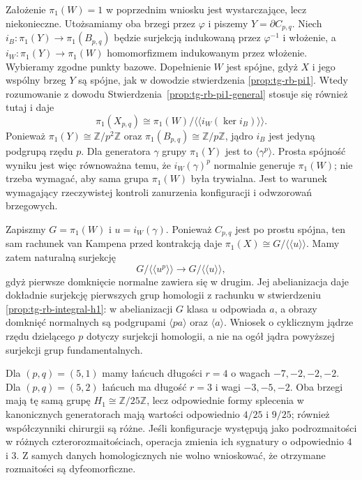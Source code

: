 \begin{uwaga}
\label{rem:tg-general-pi1-normal-closure}
Założenie $\pi_1(W)=1$ w poprzednim wniosku
jest wystarczające, lecz niekonieczne.
Utożsamiamy oba brzegi przez $\varphi$ i piszemy
$Y=\partial C_{p,q}$. Niech
$i_B\colon\pi_1(Y)\to\pi_1(B_{p,q})$
będzie surjekcją indukowaną przez
$\varphi^{-1}$ i włożenie, a
$i_W\colon\pi_1(Y)\to\pi_1(W)$
homomorfizmem indukowanym przez włożenie.
Wybieramy zgodne punkty bazowe. Dopełnienie
$W$ jest spójne, gdyż $X$ i jego wspólny
brzeg $Y$ są spójne, jak w dowodzie
stwierdzenia \ref{prop:tg-rb-pi1}.
Wtedy
rozumowanie z dowodu
Stwierdzenia~\ref{prop:tg-rb-pi1-general}
stosuje się również tutaj i daje
\[
\pi_1(X_{p,q})\cong
\pi_1(W)/\langle\!\langle i_W(\ker i_B)\rangle\!\rangle.
\]
Ponieważ $\pi_1(Y)\cong\mathbb Z/p^2\mathbb Z$
oraz $\pi_1(B_{p,q})\cong\mathbb Z/p\mathbb Z$,
jądro $i_B$ jest jedyną podgrupą rzędu $p$.
Dla generatora $\gamma$ grupy $\pi_1(Y)$
jest to $\langle\gamma^p\rangle$.
Prosta spójność wyniku jest więc równoważna
temu, że $i_W(\gamma)^p$ normalnie generuje
$\pi_1(W)$;
nie trzeba wymagać, aby sama grupa
$\pi_1(W)$ była trywialna.
Jest to warunek wymagający
rzeczywistej kontroli zanurzenia
konfiguracji i odwzorowań brzegowych.

Zapiszmy $G=\pi_1(W)$ i $u=i_W(\gamma)$.
Ponieważ $C_{p,q}$ jest po prostu spójna,
ten sam rachunek van Kampena przed kontrakcją
daje $\pi_1(X)\cong G/\langle\!\langle u\rangle\!\rangle$.
Mamy zatem naturalną surjekcję
\[
G/\langle\!\langle u^p\rangle\!\rangle
\longrightarrow G/\langle\!\langle u\rangle\!\rangle,
\]
gdyż pierwsze domknięcie normalne zawiera się
w drugim. Jej abelianizacja daje dokładnie
surjekcję pierwszych grup homologii z rachunku
w stwierdzeniu \ref{prop:tg-rb-integral-h1}:
w abelianizacji $G$ klasa $u$ odpowiada $a$,
a obrazy domknięć normalnych są podgrupami
$\langle pa\rangle$ oraz $\langle a\rangle$.
Wniosek o cyklicznym jądrze rzędu dzielącego $p$
dotyczy surjekcji homologii, a nie na ogół
jądra powyższej surjekcji grup fundamentalnych.
\end{uwaga}

\begin{przyklad}
Dla $(p,q)=(5,1)$ mamy łańcuch długości $r=4$ o wagach
$-7,-2,-2,-2$. Dla $(p,q)=(5,2)$ łańcuch ma długość
$r=3$ i wagi $-3,-5,-2$. Oba brzegi mają tę samą grupę
$H_1\cong\mathbb Z/25\mathbb Z$, lecz odpowiednie formy
splecenia w kanonicznych generatorach mają wartości
odpowiednio $4/25$ i $9/25$; również współczynniki chirurgii
są różne. Jeśli konfiguracje występują jako podrozmaitości
w różnych czterorozmaitościach, operacja zmienia ich sygnatury
o odpowiednio $4$ i $3$. Z samych danych homologicznych
nie wolno wnioskować, że otrzymane rozmaitości są dyfeomorficzne.
\end{przyklad}

